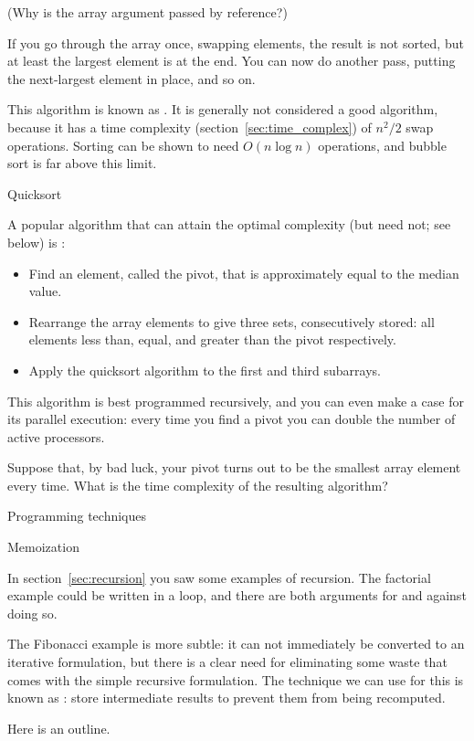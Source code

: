 
(Why is the array argument passed by reference?)

If you go through the array once, swapping elements, the result is not
sorted, but at least the largest element is at the end. You can now do
another pass, putting the next-largest element in place, and so on.

This algorithm is known as . It is generally
not considered a good algorithm, because it has a time complexity
(section~\ref{sec:time_complex}) of $n^2/2$ swap operations. Sorting
can be shown to need $O(n\log n)$ operations, and bubble sort is far
above this limit.

 {Quicksort}

A popular algorithm that can attain the optimal complexity (but need
not; see below) is :
\begin{itemize}
\item Find an element, called the pivot, that is approximately equal
  to the median value.
\item Rearrange the array elements to give three sets, consecutively
  stored: all elements less than, equal, and greater than the pivot
  respectively.
\item Apply the quicksort algorithm to the first and third subarrays.
\end{itemize}

This algorithm is best programmed recursively, and you can even make a
case for its parallel execution: every time you find a pivot you can
double the number of active processors.

\begin{exercise}
  Suppose that, by bad luck, your pivot turns out to be the smallest
  array element every time. What is the time complexity of the
  resulting algorithm?
\end{exercise}

 {Programming techniques}

 {Memoization}
\label{sec:memo}

In section~\ref{sec:recursion} you saw some examples of recursion. The
factorial example could be written in a loop, and there are both arguments
for and against doing so. 

The Fibonacci example is more subtle: it can not immediately be
converted to an iterative formulation, but there is a clear need for
eliminating some waste that comes with the simple recursive
formulation. The technique we can use for this is known as
: store intermediate results to prevent them
from being recomputed.

Here is an outline.
